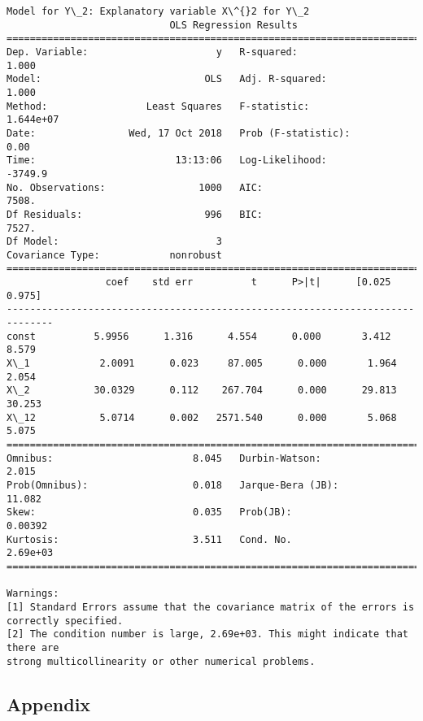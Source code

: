 \documentclass[11pt]{article}
\begin{document}
    \begin{Verbatim}[commandchars=\\\{\}]
Model for Y\_2: Explanatory variable X\^{}2 for Y\_2
                            OLS Regression Results                            
==============================================================================
Dep. Variable:                      y   R-squared:                       1.000
Model:                            OLS   Adj. R-squared:                  1.000
Method:                 Least Squares   F-statistic:                 1.644e+07
Date:                Wed, 17 Oct 2018   Prob (F-statistic):               0.00
Time:                        13:13:06   Log-Likelihood:                -3749.9
No. Observations:                1000   AIC:                             7508.
Df Residuals:                     996   BIC:                             7527.
Df Model:                           3                                         
Covariance Type:            nonrobust                                         
==============================================================================
                 coef    std err          t      P>|t|      [0.025      0.975]
------------------------------------------------------------------------------
const          5.9956      1.316      4.554      0.000       3.412       8.579
X\_1            2.0091      0.023     87.005      0.000       1.964       2.054
X\_2           30.0329      0.112    267.704      0.000      29.813      30.253
X\_12           5.0714      0.002   2571.540      0.000       5.068       5.075
==============================================================================
Omnibus:                        8.045   Durbin-Watson:                   2.015
Prob(Omnibus):                  0.018   Jarque-Bera (JB):               11.082
Skew:                           0.035   Prob(JB):                      0.00392
Kurtosis:                       3.511   Cond. No.                     2.69e+03
==============================================================================

Warnings:
[1] Standard Errors assume that the covariance matrix of the errors is correctly specified.
[2] The condition number is large, 2.69e+03. This might indicate that there are
strong multicollinearity or other numerical problems.

    \end{Verbatim}

    \subsection{Appendix}\label{appendix}
\end{document}
